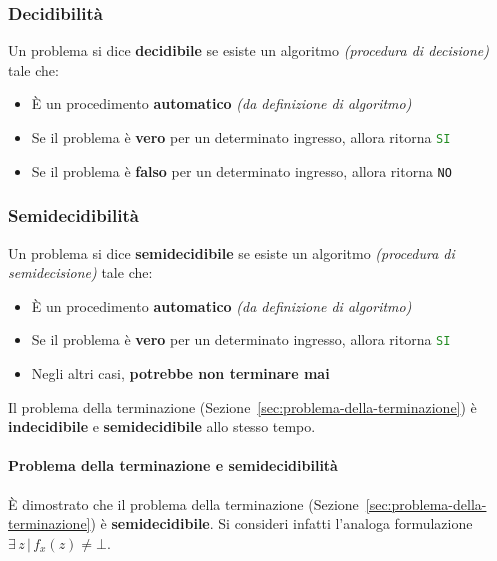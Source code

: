 \documentclass[italian, 10pt]{article}
\begin{document}
\subsubsection{Decidibilità}

Un problema si dice \textbf{decidibile} se esiste un algoritmo \textit{(procedura di decisione)} tale che:

\begin{itemize}
  \item È un procedimento \textbf{automatico} \textit{(da definizione di algoritmo)}
  \item Se il problema è \textbf{vero} per un determinato ingresso, allora ritorna \textcolor{ForestGreen}{\texttt{SI}}
  \item Se il problema è \textbf{falso} per un determinato ingresso, allora ritorna \textcolor{BrickRed}{\texttt{NO}}
\end{itemize}

\subsubsection{Semidecidibilità}

Un problema si dice \textbf{semidecidibile} se esiste un algoritmo \textit{(procedura di semidecisione)} tale che:

\begin{itemize}
  \item È un procedimento \textbf{automatico} \textit{(da definizione di algoritmo)}
  \item Se il problema è \textbf{vero} per un determinato ingresso, allora ritorna \textcolor{ForestGreen}{\texttt{SI}}
  \item Negli altri casi, \textbf{potrebbe non terminare mai}
\end{itemize}

Il problema della terminazione (Sezione~\ref{sec:problema-della-terminazione}) è \textbf{indecidibile} e \textbf{semidecidibile} allo stesso tempo.

\paragraph{Problema della terminazione e semidecidibilità}

È dimostrato che il problema della terminazione (Sezione~\ref{sec:problema-della-terminazione}) è \textbf{semidecidibile}.
Si consideri infatti l'analoga formulazione \(\exists \, z \, | \, f_x(z) \neq \bot\).
\end{document}
